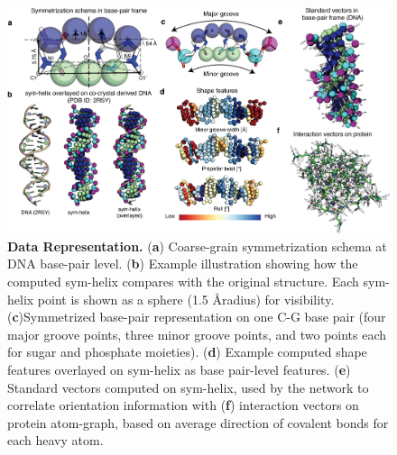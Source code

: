 \begin{center}
\begin{figure}[H]
  \includegraphics[width=\linewidth]{./pdnafigs/figS2.png}
    \caption[Data Representation.]{\textbf{Data Representation.} ({\bf a}) Coarse-grain symmetrization schema at DNA base-pair level. ({\bf b}) Example illustration showing how the computed sym-helix compares with the original structure. Each sym-helix point is shown as a sphere (1.5 \AA radius) for visibility. ({\bf c})Symmetrized base-pair representation on one C-G base pair (four major groove points, three minor groove points, and two points each for sugar and phosphate moieties). ({\bf d}) Example computed shape features overlayed on sym-helix as base pair-level features. ({\bf e}) Standard vectors computed on sym-helix, used by the network to correlate orientation information with ({\bf f}) interaction vectors on protein atom-graph, based on average direction of covalent bonds for each heavy atom.}
  \label{fig:pdnaS2}
\end{figure}
\end{center}

